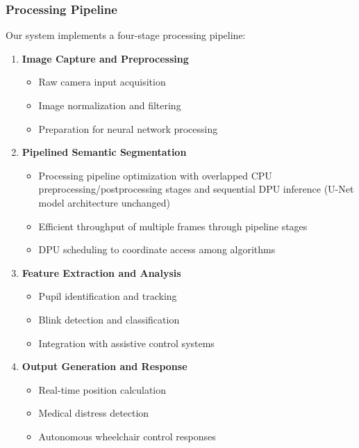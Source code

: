 \subsubsection{Processing Pipeline}
Our system implements a four-stage processing pipeline:

\begin{enumerate}
\item \textbf{Image Capture and Preprocessing}
   \begin{itemize}
   \item Raw camera input acquisition
   \item Image normalization and filtering
   \item Preparation for neural network processing
   \end{itemize}

\item \textbf{Pipelined Semantic Segmentation}~\cite{zhao2023parallel}
   \begin{itemize}
   \item Processing pipeline optimization with overlapped CPU preprocessing/postprocessing stages and sequential DPU inference (U-Net model architecture unchanged)
   \item Efficient throughput of multiple frames through pipeline stages
   \item DPU scheduling to coordinate access among algorithms
   \end{itemize}

\item \textbf{Feature Extraction and Analysis}
   \begin{itemize}
   \item Pupil identification and tracking
   \item Blink detection and classification
   \item Integration with assistive control systems
   \end{itemize}

\item \textbf{Output Generation and Response}
   \begin{itemize}
   \item Real-time position calculation
   \item Medical distress detection
   \item Autonomous wheelchair control responses
   \end{itemize}
\end{enumerate}

